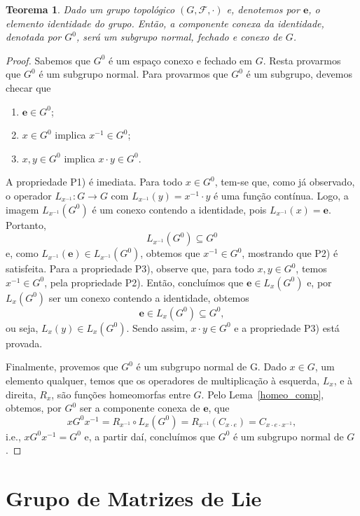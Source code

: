 \documentclass[twoside,openright,titlepage,numbers=noenddot,headinclude,  lineheaders footinclude=true,cleardoublepage=empty,
                                BCOR=5mm,paper=a4,fontsize=12pt ]{scrbook}
\newtheorem{teo}{Teorema}[chapter]
\theoremstyle{definition}
\begin{document}
\begin{teo}\label{propriedades_G0}
Dado um grupo topológico $(G, \mathcal{F}, \cdot)$ e, denotemos por $\mathbf{e}$, o elemento identidade do grupo. 
Então, a componente conexa da identidade, denotada por $G^0$, será um subgrupo normal, fechado e conexo de $G$.
\end{teo}

\begin{proof}
Sabemos que $G^0$ é um espaço conexo e fechado em $G$. Resta provarmos que $G^0$ é um subgrupo normal.
Para provarmos que $G^0$ é um subgrupo, devemos checar que
\begin{enumerate}[P1)]
	\item $\mathbf{e} \in G^0$;
	\item $x \in G^0$ implica $x^{-1} \in G^0$;
	\item $x, y \in G^0$ implica $x \cdot y \in G^0$.
\end{enumerate}
A propriedade P1) é imediata. Para todo $x \in G^0$, tem-se que, como já observado, o operador $L_{x^{-1}}: G \rightarrow G$
com $L_{x^{-1}}(y) = x^{-1} \cdot y$ é uma função contínua. Logo, a imagem $L_{x^{-1}}( G^0 )$ é
um conexo contendo a identidade, pois $L_{x^{-1}}(x) = \mathbf{e}$. Portanto,
\[ L_{x^{-1}}( G^0 ) \subseteq G^0 \]
e, como $L_{x^{-1}}(\mathbf{e}) \in L_{x^{-1}}( G^0 )$, obtemos que $x^{-1} \in G^0$, mostrando que P2) é satisfeita.
Para a propriedade P3), observe que, para todo $x, y \in G^0$, temos $x^{-1} \in G^0$, pela propriedade P2). 
Então, concluímos
que $\mathbf{e} \in L_x(G^0)$ e, por $L_x(G^0)$ ser um conexo contendo a identidade, obtemos
\[ \mathbf{e} \in L_x(G^0) \subseteq G^0, \]
ou seja, $L_x(y) \in L_x(G^0)$. Sendo assim, $x \cdot y \in G^0$ e a propriedade P3) está provada.

Finalmente, provemos que $G^0$ é um subgrupo normal de G. 
Dado $x \in G$, um elemento qualquer, temos que os operadores de multiplicação à 
esquerda, $L_x$, e à direita, $R_x$, são funções homeomorfas entre $G$. 
Pelo Lema~\ref{homeo_comp}, obtemos, por $G^0$ ser a componente conexa de $\mathbf{e}$,
que
\[ x G^0 x^{-1} = R_{x^{-1}} \circ L_x(G^0) = R_{x^{-1}}(C_{x \cdot e}) = C_{x \cdot e \cdot x^{-1}}, \]
i.e., $x G^0 x^{-1} = G^0$ e, a partir daí, concluímos que $G^0$ é um subgrupo normal de $G$.
\end{proof}



\section{Grupo de Matrizes de Lie} \label{sec:liegroup}
\end{document}
